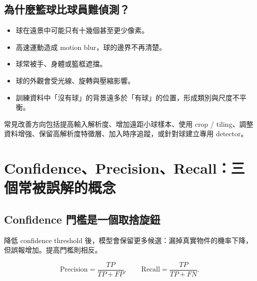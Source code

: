 \documentclass[11pt,a4paper,oneside]{report}
\begin{document}
\subsection{為什麼籃球比球員難偵測？}

\begin{itemize}
  \item 球在遠景中可能只有十幾個甚至更少像素。
  \item 高速運動造成 motion blur，球的邊界不再清楚。
  \item 球常被手、身體或籃框遮擋。
  \item 球的外觀會受光線、旋轉與壓縮影響。
  \item 訓練資料中「沒有球」的背景遠多於「有球」的位置，形成類別與尺度不平衡。
\end{itemize}

常見改善方向包括提高輸入解析度、增加遠距小球樣本、使用 crop / tiling、調整資料增強、保留高解析度特徵層、加入時序追蹤，或針對球建立專用 detector。

\section{Confidence、Precision、Recall：三個常被誤解的概念}

\subsection{Confidence 門檻是一個取捨旋鈕}

降低 confidence threshold 後，模型會保留更多候選：漏掉真實物件的機率下降，但誤報增加。提高門檻則相反。

\[
\mathrm{Precision}=\frac{TP}{TP+FP},
\qquad
\mathrm{Recall}=\frac{TP}{TP+FN}.
\]

\begin{center}
\end{center}
\end{document}
